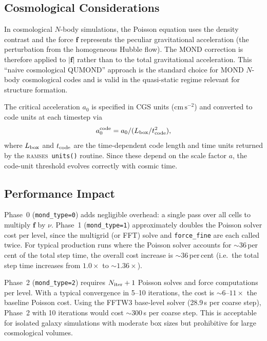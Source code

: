 \documentclass[fleqn,usenatbib]{mnras}
\newcommand{\ramses}{\textsc{ramses}}
\newcommand{\code}[1]{\texttt{#1}}
\newcommand{\azero}{a_0}
\begin{document}
\subsection{Cosmological Considerations}
\label{sec:mond_cosmo}

In cosmological $N$-body simulations, the Poisson equation uses the
density contrast and the force $\mathbf{f}$ represents the peculiar
gravitational acceleration (the perturbation from the homogeneous
Hubble flow).  The MOND correction is therefore applied to $|\mathbf{f}|$
rather than to the total gravitational acceleration.  This ``naive
cosmological QUMOND'' approach is the standard choice for MOND
$N$-body cosmological codes
\citep{Lughausen2015,Candlish2015,Nagesh2021} and is valid in the
quasi-static regime relevant for structure formation.

The critical acceleration $\azero$ is specified in CGS units
($\mathrm{cm\,s^{-2}}$) and converted to code units at each timestep
via
\begin{equation}
\azero^{\rm code} = \azero / (L_{\rm box}/t_{\rm code}^2),
\end{equation}
where $L_{\rm box}$ and $t_{\rm code}$ are the time-dependent code
length and time units returned by the \ramses\ \code{units()} routine.
Since these depend on the scale factor $a$, the code-unit threshold
evolves correctly with cosmic time.

\subsection{Performance Impact}
\label{sec:mond_perf}

Phase~0 (\code{mond\_type=0}) adds negligible overhead: a single pass
over all cells to multiply $\mathbf{f}$ by $\nu$.  Phase~1
(\code{mond\_type=1}) approximately doubles the Poisson solver cost
per level, since the multigrid (or FFT) solve and \code{force\_fine}
are each called twice.  For typical production runs where the Poisson
solver accounts for ${\sim}36$\,per\,cent of the total step time, the
overall cost increase is ${\sim}36$\,per\,cent (i.e.\ the total step
time increases from $1.0\times$ to ${\sim}1.36\times$).

Phase~2 (\code{mond\_type=2}) requires $N_{\rm iter}+1$ Poisson
solves and force computations per level.  With a typical convergence
in 5--10 iterations, the cost is ${\sim}6$--$11\times$ the baseline
Poisson cost.  Using the FFTW3 base-level solver (28.9\,s per
coarse step), Phase~2 with 10 iterations would cost ${\sim}300$\,s
per coarse step.  This is acceptable for isolated galaxy simulations
with moderate box sizes but prohibitive for large cosmological volumes.
\end{document}
